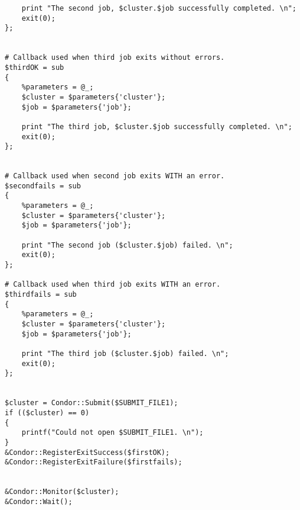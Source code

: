 \begin{verbatim}
    print "The second job, $cluster.$job successfully completed. \n";
    exit(0);
};	


# Callback used when third job exits without errors.
$thirdOK = sub
{
    %parameters = @_;
    $cluster = $parameters{'cluster'};
    $job = $parameters{'job'};

    print "The third job, $cluster.$job successfully completed. \n";
    exit(0);
};	


# Callback used when second job exits WITH an error.
$secondfails = sub
{
    %parameters = @_;
    $cluster = $parameters{'cluster'};
    $job = $parameters{'job'};

    print "The second job ($cluster.$job) failed. \n";
    exit(0);
};	

# Callback used when third job exits WITH an error.
$thirdfails = sub
{
    %parameters = @_;
    $cluster = $parameters{'cluster'};
    $job = $parameters{'job'};

    print "The third job ($cluster.$job) failed. \n";
    exit(0);
};	


$cluster = Condor::Submit($SUBMIT_FILE1);
if (($cluster) == 0)
{
    printf("Could not open $SUBMIT_FILE1. \n");
}
&Condor::RegisterExitSuccess($firstOK);
&Condor::RegisterExitFailure($firstfails);


&Condor::Monitor($cluster);
&Condor::Wait();
\end{verbatim}
\normalsize
